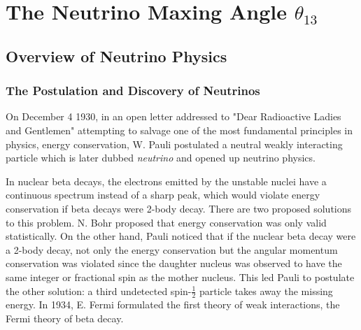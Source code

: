 \chapter{The Neutrino Maxing Angle \texorpdfstring{$\theta_{13}$}{theta13}}

\section{Overview of Neutrino Physics}

\subsection{The Postulation and Discovery of Neutrinos}
On December 4 1930, in an open letter addressed to "Dear Radioactive Ladies and Gentlemen" attempting to salvage one of the most fundamental principles in physics, energy conservation, W. Pauli postulated a neutral weakly interacting particle which is later dubbed \emph{neutrino} and opened up neutrino physics.

In nuclear beta decays, the electrons emitted by the unstable nuclei have a continuous spectrum instead of a sharp peak, which would violate energy conservation if beta decays were 2-body decay. There are two proposed solutions to this problem. N. Bohr proposed that energy conservation was only valid statistically. On the other hand, Pauli noticed that if the nuclear beta decay were a 2-body decay, not only the energy conservation but the angular momentum conservation was violated since the daughter nucleus was observed to have the same integer or fractional spin as the mother nucleus. This led Pauli to  postulate the other solution: a third undetected spin-$\frac{1}{2}$ particle takes away the missing energy. In 1934, E. Fermi formulated the first theory of weak interactions, the Fermi theory of beta decay.

